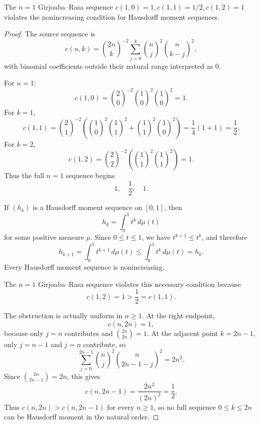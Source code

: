 \begin{counterexample}[Girjoaba Rasa c(n,k) n=1 Hausdorff moment counterexample]
\label{res:gr-cnk-n1-hausdorff-counterexample}
The \(n=1\) Girjoaba--Rasa sequence \(c(1,0)=1,c(1,1)=1/2,c(1,2)=1\) violates the nonincreasing condition for Hausdorff moment sequences.
\end{counterexample}
\begin{proof}
The source sequence is
\[
c(n,k)=\binom{2n}{k}^{-2}
\sum_{j=0}^k \binom{n}{j}^2\binom{n}{k-j}^2,
\]
with binomial coefficients outside their natural range interpreted as \(0\).

For \(n=1\):
\[
c(1,0)=\binom20^{-2}\binom10^2\binom10^2=1.
\]
For \(k=1\),
\[
c(1,1)=\binom21^{-2}
\left(\binom10^2\binom11^2+\binom11^2\binom10^2\right)
=\frac14(1+1)=\frac12.
\]
For \(k=2\),
\[
c(1,2)=\binom22^{-2}
\left(\binom11^2\binom11^2\right)=1.
\]
Thus the full \(n=1\) sequence begins
\[
1,\quad \frac12,\quad 1.
\]

If \((h_k)\) is a Hausdorff moment sequence on \([0,1]\), then
\[
h_k=\int_0^1 t^k\,d\mu(t)
\]
for some positive measure \(\mu\).  Since \(0\le t\le1\), we have \(t^{k+1}\le t^k\), and therefore
\[
h_{k+1}=\int_0^1 t^{k+1}\,d\mu(t)
\le
\int_0^1 t^k\,d\mu(t)=h_k.
\]
Every Hausdorff moment sequence is nonincreasing.

The \(n=1\) Girjoaba--Rasa sequence violates this necessary condition because
\[
c(1,2)=1>\frac12=c(1,1).
\]

The obstruction is actually uniform in \(n\ge1\).  At the right endpoint,
\[
c(n,2n)=1,
\]
because only \(j=n\) contributes and \(\binom{2n}{2n}=1\).  At the adjacent point \(k=2n-1\), only \(j=n-1\) and \(j=n\) contribute, so
\[
\sum_{j=0}^{2n-1}\binom{n}{j}^2\binom{n}{2n-1-j}^2
=2n^2.
\]
Since \(\binom{2n}{2n-1}=2n\), this gives
\[
c(n,2n-1)=\frac{2n^2}{(2n)^2}=\frac12.
\]
Thus \(c(n,2n)>c(n,2n-1)\) for every \(n\ge1\), so no full sequence \(0\le k\le2n\) can be Hausdorff moment in the natural order.
\end{proof}

